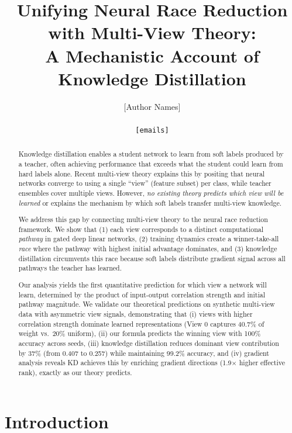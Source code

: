 \documentclass{article}
\title{Unifying Neural Race Reduction with Multi-View Theory:\\ A Mechanistic Account of Knowledge Distillation}
\author{
[Author Names] \\
[Affiliations] \\
\texttt{[emails]}
}
\begin{document}
\maketitle

\begin{abstract}
Knowledge distillation enables a student network to learn from soft labels produced by a teacher, often achieving performance that exceeds what the student could learn from hard labels alone. Recent multi-view theory explains this by positing that neural networks converge to using a single ``view'' (feature subset) per class, while teacher ensembles cover multiple views. However, \emph{no existing theory predicts which view will be learned} or explains the mechanism by which soft labels transfer multi-view knowledge.

We address this gap by connecting multi-view theory to the neural race reduction framework. We show that (1) each view corresponds to a distinct computational \emph{pathway} in gated deep linear networks, (2) training dynamics create a winner-take-all \emph{race} where the pathway with highest initial advantage dominates, and (3) knowledge distillation circumvents this race because soft labels distribute gradient signal across all pathways the teacher has learned.

Our analysis yields the first quantitative prediction for which view a network will learn, determined by the product of input-output correlation strength and initial pathway magnitude. We validate our theoretical predictions on synthetic multi-view data with asymmetric view signals, demonstrating that (i) views with higher correlation strength dominate learned representations (View 0 captures 40.7\% of weight vs.\ 20\% uniform), (ii) our formula predicts the winning view with 100\% accuracy across seeds, (iii) knowledge distillation reduces dominant view contribution by 37\% (from 0.407 to 0.257) while maintaining 99.2\% accuracy, and (iv) gradient analysis reveals KD achieves this by enriching gradient directions (1.9$\times$ higher effective rank), exactly as our theory predicts.
\end{abstract}

\section{Introduction}
\end{document}
